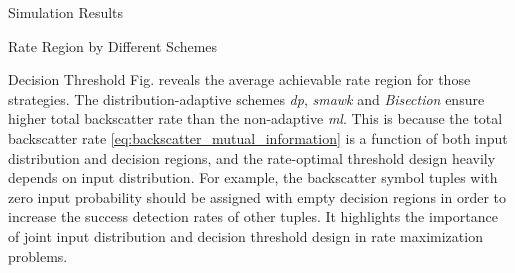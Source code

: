 \documentclass[journal]{IEEEtran}
\begin{document}
\begin{section}{Simulation Results}
\begin{subsection}{Rate Region by Different Schemes}
\begin{subsubsection}{Decision Threshold}
			Fig.  reveals the average achievable rate region for those strategies.
			The distribution-adaptive schemes \emph{\gls{dp}}, \emph{\gls{smawk}} and \emph{Bisection} ensure higher total backscatter rate than the non-adaptive \emph{\gls{ml}}.
			This is because the total backscatter rate \eqref{eq:backscatter_mutual_information} is a function of both input distribution and decision regions, and the rate-optimal threshold design heavily depends on input distribution.
			For example, the backscatter symbol tuples with zero input probability should be assigned with empty decision regions in order to increase the success detection rates of other tuples.
			It highlights the importance of joint input distribution and decision threshold design in rate maximization problems.
		\end{subsubsection}

	\end{subsection}



\end{section}
\end{document}
